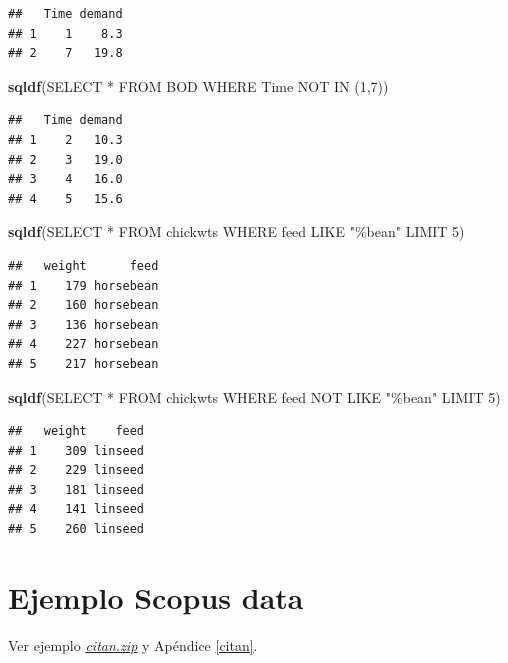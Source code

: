 \documentclass[
]{book}
\newenvironment{Shaded}{\begin{snugshade}}{\end{snugshade}}
\newcommand{\FunctionTok}[1]{\textcolor[rgb]{0.13,0.29,0.53}{\textbf{#1}}}
\newcommand{\NormalTok}[1]{#1}
\newcommand{\StringTok}[1]{\textcolor[rgb]{0.31,0.60,0.02}{#1}}
\begin{document}
\begin{verbatim}
##   Time demand
## 1    1    8.3
## 2    7   19.8
\end{verbatim}

\begin{Shaded}
\begin{Highlighting}[]
\FunctionTok{sqldf}\NormalTok{(}\StringTok{\textquotesingle{}SELECT * FROM BOD WHERE Time NOT IN (1,7)\textquotesingle{}}\NormalTok{)}
\end{Highlighting}
\end{Shaded}

\begin{verbatim}
##   Time demand
## 1    2   10.3
## 2    3   19.0
## 3    4   16.0
## 4    5   15.6
\end{verbatim}

\begin{Shaded}
\begin{Highlighting}[]
\FunctionTok{sqldf}\NormalTok{(}\StringTok{\textquotesingle{}SELECT * FROM chickwts WHERE feed LIKE "\%bean" LIMIT 5\textquotesingle{}}\NormalTok{)}
\end{Highlighting}
\end{Shaded}

\begin{verbatim}
##   weight      feed
## 1    179 horsebean
## 2    160 horsebean
## 3    136 horsebean
## 4    227 horsebean
## 5    217 horsebean
\end{verbatim}

\begin{Shaded}
\begin{Highlighting}[]
\FunctionTok{sqldf}\NormalTok{(}\StringTok{\textquotesingle{}SELECT * FROM chickwts WHERE feed NOT LIKE "\%bean" LIMIT 5\textquotesingle{}}\NormalTok{)}
\end{Highlighting}
\end{Shaded}

\begin{verbatim}
##   weight    feed
## 1    309 linseed
## 2    229 linseed
## 3    181 linseed
## 4    141 linseed
## 5    260 linseed
\end{verbatim}

\section{Ejemplo Scopus data}\label{ejemplo-scopus-data}

Ver ejemplo \href{data/citan.zip}{\emph{citan.zip}} y Apéndice \ref{citan}.
\end{document}
